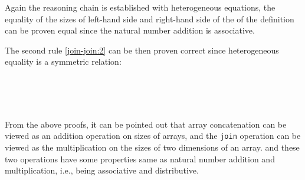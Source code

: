 \documentclass{l4proj}
\begin{document}
Again the reasoning chain is established with heterogeneous equations, the equality of the sizes of left-hand side and right-hand side of the of the definition can be proven equal since the natural number addition is associative.

The second rule \ref{join-join:2} can be then proven correct since heterogeneous equality is a symmetric relation:
\begin{code}%
\>[0]\<%
\\
\>[0]\AgdaSpace{}%
\AgdaSymbol{:}%
\>[420I]\AgdaSymbol{\{}\AgdaSpace{}%
\AgdaSpace{}%
\AgdaSpace{}%
\AgdaSymbol{:}\AgdaSpace{}%
\AgdaSymbol{\}}\AgdaSpace{}%
\AgdaSpace{}%
\AgdaSymbol{\{}\AgdaSpace{}%
\AgdaSymbol{:}\AgdaSpace{}%
\AgdaSymbol{\}}\AgdaSpace{}%
\AgdaSpace{}%
\AgdaSymbol{(}\AgdaSpace{}%
\AgdaSymbol{:}\AgdaSpace{}%
\AgdaSpace{}%
\AgdaSymbol{(}\AgdaSpace{}%
\AgdaSymbol{(}\AgdaSpace{}%
\AgdaSpace{}%
\AgdaSymbol{)}\AgdaSpace{}%
\AgdaSymbol{)}\AgdaSpace{}%
\AgdaSymbol{)}\AgdaSpace{}%
\<%
\\
\>[.][@{}l@{}]\<[420I]%
\>[20]\AgdaSpace{}%
\AgdaSymbol{(}\AgdaSpace{}%
\AgdaSpace{}%
\AgdaSymbol{)}\AgdaSpace{}%
\AgdaSpace{}%
\AgdaSpace{}%
\AgdaSymbol{(}\AgdaSpace{}%
\AgdaSymbol{)}\<%
\\
\>[0]\AgdaSpace{}%
\AgdaSpace{}%
\AgdaSymbol{=}\AgdaSpace{}%
\AgdaSpace{}%
\AgdaSymbol{(}\AgdaSpace{}%
\AgdaSymbol{)}\<%
\end{code}

From the above proofs, it can be pointed out that array concatenation can be viewed as an addition operation on sizes of arrays, and the \texttt{join} operation can be viewed as the multiplication on the sizes of two dimensions of an array. and these two operations have some properties same as natural number addition and multiplication, i.e., being associative and distributive.
\end{document}
